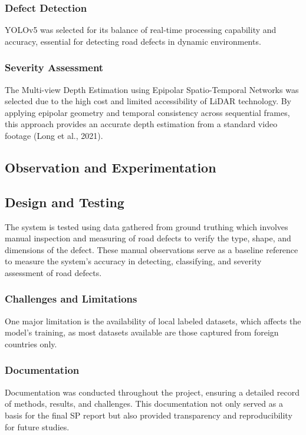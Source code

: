	\subsubsection{Defect Detection}
	YOLOv5 was selected for its balance of real-time processing capability and accuracy, essential for detecting road defects in dynamic environments.
	
	\subsubsection{Severity Assessment}
	The Multi-view Depth Estimation using Epipolar Spatio-Temporal Networks was selected due to the high cost and limited accessibility of LiDAR technology. By applying epipolar geometry and temporal consistency across sequential frames, this approach provides an accurate depth estimation from a standard video footage (Long et al., 2021). 
	
	\subsection{\textbf{Observation and Experimentation} }
	
	\subsection{\textbf{Design and Testing} }
	The system is tested using data gathered from ground truthing which involves manual inspection and measuring of road defects to verify the type, shape, and dimensions of the defect. These manual observations serve as a baseline reference to measure the system’s accuracy in detecting, classifying, and severity assessment of road defects. 
	
	\subsubsection{Challenges and Limitations}
	One major limitation is the availability of local labeled datasets, which affects the model’s training, as most datasets available are those captured from foreign countries only.
	
	\subsubsection{Documentation}
	Documentation was conducted throughout the project, ensuring a detailed record of methods, results, and challenges. This documentation not only served as a basis for the final SP report but also provided transparency and reproducibility for future studies.
	
